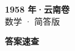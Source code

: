 \documentclass[zihao=-4, a4paper]{ctexart}
\begin{document}
\begin{center}
  {\Large\bfseries 1958 年·云南卷}\\[4pt]
  {\large 数学 · 简答版}
\end{center}
\medskip
{}

\clearpage
{}
\begin{center}{\Large\bfseries 答案速查}\end{center}
\medskip

\end{document}
